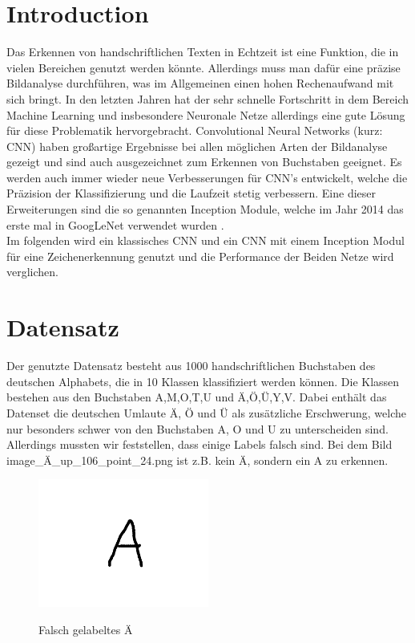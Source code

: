 \documentclass[runningheads,a4paper]{llncs}[2015/06/24]
\begin{document}
\section{Introduction}\label{sec:intro}
Das Erkennen von handschriftlichen Texten in Echtzeit ist eine Funktion, die in vielen Bereichen genutzt werden könnte. Allerdings muss man dafür eine präzise Bildanalyse durchführen, was im Allgemeinen einen hohen Rechenaufwand mit sich bringt. In den letzten Jahren hat der sehr schnelle Fortschritt in dem Bereich Machine Learning und insbesondere Neuronale Netze allerdings eine gute Lösung für diese Problematik hervorgebracht. Convolutional Neural Networks (kurz: CNN) haben großartige Ergebnisse bei allen möglichen Arten der Bildanalyse gezeigt und sind auch ausgezeichnet zum Erkennen von Buchstaben geeignet. Es werden auch immer wieder neue Verbesserungen für CNN's entwickelt, welche die Präzision der Klassifizierung und die Laufzeit stetig verbessern. Eine dieser Erweiterungen sind die so genannten Inception Module, welche im Jahr 2014 das erste mal in GoogLeNet verwendet wurden \cite{inception_paper}.\\
Im folgenden wird ein klassisches CNN und ein CNN mit einem Inception Modul für eine Zeichenerkennung genutzt und die Performance der Beiden Netze wird verglichen.\\

\section{Datensatz}\label{sec:dataset}
Der genutzte Datensatz besteht aus 1000 handschriftlichen Buchstaben des deutschen Alphabets, die in 10 Klassen klassifiziert werden können. 
Die Klassen bestehen aus den Buchstaben A,M,O,T,U und Ä,Ö,Ü,Y,V.
Dabei enthält das Datenset die deutschen Umlaute \"{A}, \"{O} und \"{U} als zusätzliche Erschwerung, welche nur besonders schwer von den Buchstaben A, O und U zu unterscheiden sind.
Allerdings mussten wir feststellen, dass einige Labels falsch sind. Bei dem Bild \glqq image\_Ä\_up\_106\_point\_24.png \grqq ist z.B. kein Ä, sondern ein A zu erkennen.
\begin{figure}
	\caption{Falsch gelabeltes Ä}
	\includegraphics[width=0.5\textwidth]{hand_images/image_Ae_up_106_point_24.png}
	\label{fig:main_graph}
\end{figure}
\end{document}
